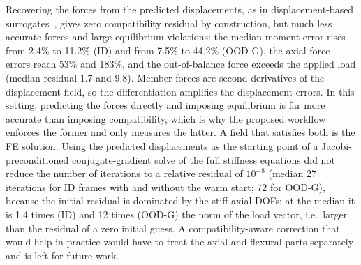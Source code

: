 Recovering the forces from the predicted displacements, as in displacement-based surrogates~\cite{leng2026mcgnn}, gives zero compatibility residual by construction, but much less accurate forces and large equilibrium violations: the median moment error rises from 2.4\% to 11.2\% (ID) and from 7.5\% to 44.2\% (OOD-G), the axial-force errors reach 53\% and 183\%, and the out-of-balance force exceeds the applied load (median residual 1.7 and 9.8). Member forces are second derivatives of the displacement field, so the differentiation amplifies the displacement errors. In this setting, predicting the forces directly and imposing equilibrium is far more accurate than imposing compatibility, which is why the proposed workflow enforces the former and only measures the latter. A field that satisfies both is the FE solution. Using the predicted displacements as the starting point of a Jacobi-preconditioned conjugate-gradient solve of the full stiffness equations did not reduce the number of iterations to a relative residual of $10^{-8}$ (median 27 iterations for ID frames with and without the warm start; 72 for OOD-G), because the initial residual is dominated by the stiff axial DOFs: at the median it is 1.4 times (ID) and 12 times (OOD-G) the norm of the load vector, i.e.\ larger than the residual of a zero initial guess. A compatibility-aware correction that would help in practice would have to treat the axial and flexural parts separately and is left for future work.
